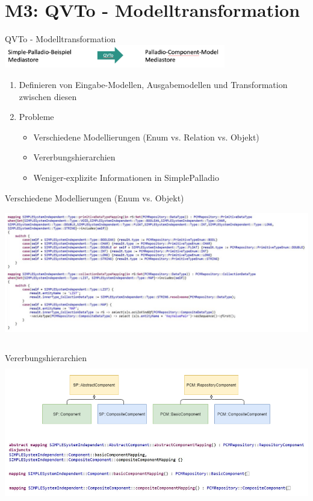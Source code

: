 \section[M3: QVTo]{M3: QVTo - Modelltransformation}
\begin{frame}{QVTo - Modelltransformation}
	\centering
	\includegraphics[height=10mm]{figures/modelltransformation.png}
	\begin{enumerate}
		\item Definieren von Eingabe-Modellen, Ausgabemodellen und Transformation zwischen diesen
		\item Probleme
		\begin{itemize}
			\item Verschiedene Modellierungen (Enum vs. Relation vs. Objekt)
			\item Vererbungshierarchien
			\item Weniger-explizite Informationen in SimplePalladio
		\end{itemize}
	\end{enumerate}
\end{frame}

\begin{frame}{Verschiedene Modellierungen (Enum vs. Objekt)}
	\centering
	\includegraphics[height=60mm]{figures/modellierung-enum-objekt.png}
\end{frame}

\begin{frame}{Vererbungshierarchien}
	\centering
	\includegraphics[height=60mm]{figures/vererbungshierachien.png}
\end{frame}

